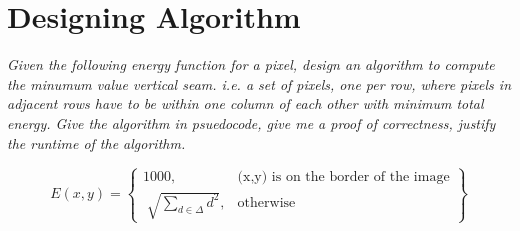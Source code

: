 \documentclass{homework}
\begin{document}
\section*{Designing Algorithm} %
\textit{Given the following energy function for a pixel, design an algorithm to
  compute the minumum value vertical seam. i.e. a set of pixels, one per row,
  where pixels in adjacent rows have to be within one column of each other with
  minimum total energy. Give the algorithm in psuedocode, give me a proof of
  correctness, justify the runtime of the algorithm.}

    \begin{equation}
      E(x,y) =
      \left\{
        \begin{array}{lr}
          1000, & \text{(x,y) is on the border of the image}\\
          \sqrt[]{\sum_{d \in \Delta} d^2}, & \text{otherwise}
        \end{array}
      \right\}
    \end{equation}

  
\end{document}
